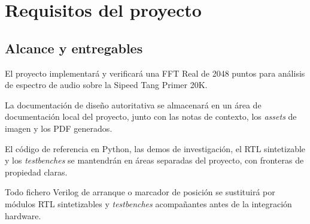 \documentclass[11pt,a4paper]{article}
\begin{document}
\section{Requisitos del proyecto}

\subsection{Alcance y entregables}
\begin{description}[leftmargin=4.2em,style=nextline]
  \item[PRJ-1:] El proyecto implementará y verificará una FFT Real de 2048 puntos
    para análisis de espectro de audio sobre la Sipeed Tang Primer 20K.
  \item[PRJ-2:] La documentación de diseño autoritativa se almacenará en un área
    de documentación local del proyecto, junto con las notas de contexto, los
    \emph{assets} de imagen y los PDF generados.
  \item[PRJ-3:] El código de referencia en Python, las demos de investigación, el
    RTL sintetizable y los \emph{testbenches} se mantendrán en áreas separadas
    del proyecto, con fronteras de propiedad claras.
  \item[PRJ-4:] Todo fichero Verilog de arranque o marcador de posición se
    sustituirá por módulos RTL sintetizables y \emph{testbenches} acompañantes
    antes de la integración hardware.
\end{description}
\end{document}
